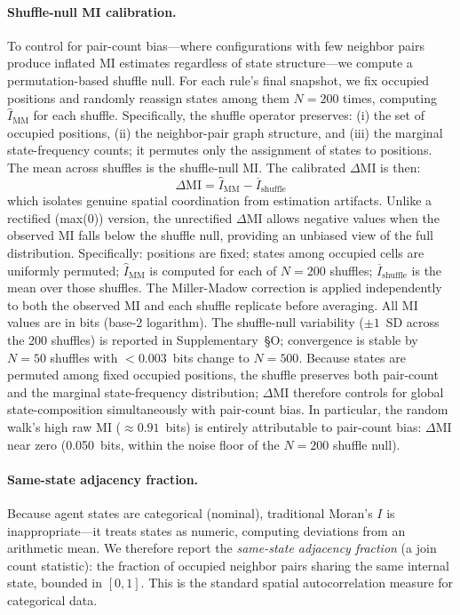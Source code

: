 \documentclass[letterpaper]{article}
\begin{document}
\paragraph{Shuffle-null MI calibration.}
To control for pair-count bias---where configurations with few neighbor pairs
produce inflated MI estimates regardless of state structure---we compute a
permutation-based shuffle null.  For each rule's final snapshot, we fix
occupied positions and randomly reassign states among them $N = 200$ times,
computing $\hat{I}_{\mathrm{MM}}$ for each shuffle.  Specifically, the shuffle
operator preserves: (i) the set of occupied positions, (ii) the neighbor-pair
graph structure, and (iii) the marginal state-frequency counts; it permutes
only the assignment of states to positions.  The mean across shuffles
is the shuffle-null MI.  The calibrated $\Delta\mathrm{MI}$ is then:
\begin{equation}
  \Delta\mathrm{MI} = \hat{I}_{\mathrm{MM}} - \overline{I}_{\mathrm{shuffle}}
  \label{eq:delta_mi}
\end{equation}
which isolates genuine spatial coordination from estimation artifacts.
Unlike a rectified (max(0)) version, the unrectified $\Delta\mathrm{MI}$
allows negative values when the observed MI falls below the shuffle null,
providing an unbiased view of the full distribution.
Specifically: positions are fixed; states among occupied cells are uniformly
permuted; $\hat{I}_{\mathrm{MM}}$ is computed for each of $N=200$ shuffles;
$\overline{I}_{\mathrm{shuffle}}$ is the mean over those shuffles.
The Miller-Madow correction is applied independently to both the observed MI
and each shuffle replicate before averaging.
All MI values are in bits (base-2 logarithm). The shuffle-null variability ($\pm 1$~SD across the 200 shuffles) is reported in Supplementary~\S{}O; convergence is stable by $N=50$ shuffles with $<\!0.003$~bits change to $N=500$. Because states are permuted among fixed occupied positions, the shuffle preserves both pair-count and the marginal state-frequency distribution; $\Delta\mathrm{MI}$ therefore controls for global state-composition simultaneously with pair-count bias.
In particular, the random walk's high raw MI
($\approx 0.91$~bits) is entirely attributable to pair-count bias:
$\Delta\mathrm{MI}$ near zero (0.050~bits, within the noise floor
of the $N\!=\!200$ shuffle null).

\paragraph{Same-state adjacency fraction.}
Because agent states are categorical (nominal), traditional Moran's $I$ is
inappropriate---it treats states as numeric, computing deviations from an
arithmetic mean.  We therefore report the \emph{same-state adjacency fraction}
(a join count statistic): the fraction of occupied neighbor pairs sharing the
same internal state, bounded in $[0, 1]$.  This is the standard spatial
autocorrelation measure for categorical data.
\end{document}
